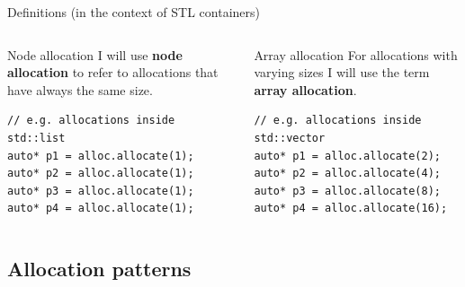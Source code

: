\documentclass[10pt,aspectratio=169]{beamer}
\begin{document}
\begin{frame}[fragile]
{Definitions (in the context of STL containers)}
\begin{columns}
\begin{column}{0.45\textwidth}

\begin{block} {Node allocation}
I will use {\bf \color{alertc} node allocation} to refer to
allocations that have always the same size.
\end{block}
\vspace{0.5cm}
\begin{lstlisting}
// e.g. allocations inside std::list
auto* p1 = alloc.allocate(1);
auto* p2 = alloc.allocate(1);
auto* p3 = alloc.allocate(1);
auto* p4 = alloc.allocate(1);
\end{lstlisting}

\end{column}

\begin{column}{0.45\textwidth}
\begin{block} {Array allocation}
For allocations with varying sizes I will use the term {\bf \color{alertc} array allocation}.
\end{block}
\vspace{0.5cm}
\begin{lstlisting}
// e.g. allocations inside std::vector
auto* p1 = alloc.allocate(2);
auto* p2 = alloc.allocate(4);
auto* p3 = alloc.allocate(8);
auto* p4 = alloc.allocate(16);
\end{lstlisting}
\end{column}
\end{columns}
\end{frame}

\subsection{Allocation patterns}
\end{document}

